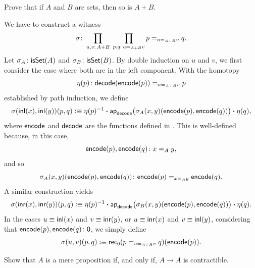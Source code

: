 \begin{exr}
    Prove that if\/ $A$ and\/ $B$ are sets, then so is\/ $A+B$.
\end{exr}

\begin{solution}
    We have to construct a witness
    \[
        \sigma\colon\prod_{u,v\colon A+B}\;\prod_{p,q\colon u\eq{A+B}v}
            p\eq{u\eq{A+B}v}q.
    \]
    Let $\sigma_A\colon\fun{isSet}(A)$ and $\sigma_B\colon\fun{isSet}(B)$. By double induction on $u$ and $v$, we first consider the case where both are in the left component. With the homotopy
    \[
        \eta(p)\colon\fun{decode}(\fun{encode}(p))\eq{u\eq{A+B}v}p
    \]
    established by path induction, we define
    \[
        \sigma(\mathsf{inl}(x),\mathsf{inl}(y))(p,q)\mathrel{\vcentcolon}\equiv
            \eta(p)^{-1}\mathbin{\boldsymbol{\cdot}}
            \mathsf{ap}_{\mathsf{decode}}
            \bigl(
                \sigma_A(x,y)(\mathsf{encode}(p),\mathsf{encode}(q))
            \bigr)
            \mathbin{\boldsymbol{\cdot}}\eta(q),
    \]
    where $\mathsf{encode}$ and $\mathsf{decode}$ are the functions defined in . This is well-defined because, in this case,
    \[
        \fun{encode}(p),\fun{encode}(q)\colon x\eq Ay,
    \]
    and so
    \[
        \sigma_A(x,y)(\fun{encode}(p),\fun{encode}(q))
            \colon
                \fun{encode}(p)
                \eq{x\eq Ay}
                \fun{encode}(q).
    \]
    A similar construction yields
    \[
        \sigma(\mathsf{inr}(x),\mathsf{inr}(y))(p,q)\mathrel{\vcentcolon}\equiv
            \eta(p)^{-1}\mathbin{\boldsymbol{\cdot}}
            \mathsf{ap}_{\mathsf{decode}}
            \bigl(
                \sigma_B(x,y)(\mathsf{encode}(p),\mathsf{encode}(q))
            \bigr)
            \mathbin{\boldsymbol{\cdot}}\eta(q).
    \]
    In the cases $u\equiv\mathsf{inl}(x)$ and $v\equiv\mathsf{inr}(y)$, or $u\equiv\mathsf{inr}(x)$ and $v\equiv\mathsf{inl}(y)$, considering that $\fun{encode}(p),\fun{encode}(q)\colon\fun0$, we simply define
    \[
        \sigma(u,v)(p,q)
            \mathrel{\vcentcolon}\equiv\mathsf{rec}_{\mathsf{0}}(p\mathrel{=_{u\mathrel{=_{A+B}}v}}q)(\mathsf{encode}(p)).
    \]
\end{solution}

\begin{exr}\fe
    Show that\/ $A$ is a mere proposition if, and only if, $A\to A$ is contractible.
\end{exr}

